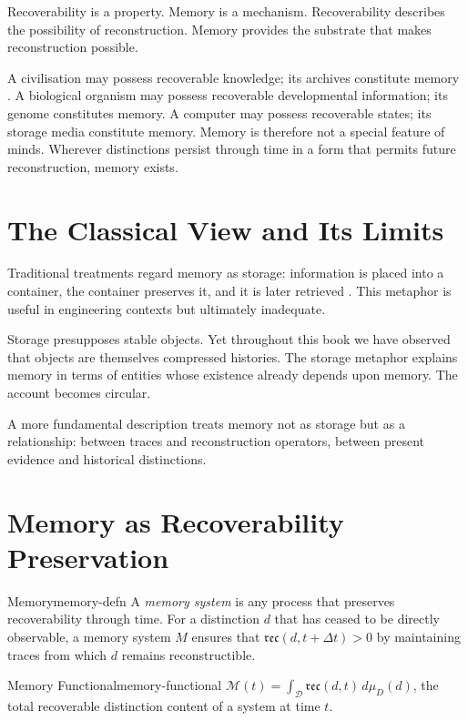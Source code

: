 \documentclass[12pt,twoside,openright]{book}
\newcommand{\reco}{\mathfrak{rec}}
\begin{document}
Recoverability is a property. Memory is a mechanism.
Recoverability describes the possibility of reconstruction.
Memory provides the substrate that makes reconstruction
possible.

A civilisation may possess recoverable knowledge; its
archives constitute memory \parencite{tulving1983}.
A biological organism may possess recoverable developmental
information; its genome constitutes memory.
A computer may possess recoverable states; its storage
media constitute memory. Memory is therefore not a special
feature of minds. Wherever distinctions persist through
time in a form that permits future reconstruction,
memory exists.

\section{The Classical View and Its Limits}
\label{sec:ch6-classical}

Traditional treatments regard memory as storage:
information is placed into a container, the container
preserves it, and it is later retrieved \parencite{james1890}.
This metaphor is useful in engineering contexts but
ultimately inadequate.

Storage presupposes stable objects. Yet throughout this
book we have observed that objects are themselves
compressed histories. The storage metaphor explains memory
in terms of entities whose existence already depends upon
memory. The account becomes circular.

A more fundamental description treats memory not as
storage but as a relationship: between traces and
reconstruction operators, between present evidence and
historical distinctions.

\section{Memory as Recoverability Preservation}
\label{sec:ch6-memory}

\begin{definition}{Memory}{memory-defn}
  A \emph{memory system} is any process that preserves
  recoverability through time. For a distinction $d$
  that has ceased to be directly observable, a memory
  system $M$ ensures that $\reco(d, t + \Delta t) > 0$
  by maintaining traces from which $d$ remains
  reconstructible.
\end{definition}

\begin{definition}{Memory Functional}{memory-functional}
  $\mathcal{M}(t) = \int_\mathcal{D} \reco(d, t)\,d\mu_D(d)$,
  the total recoverable distinction content of a system
  at time $t$.
\end{definition}
\end{document}
